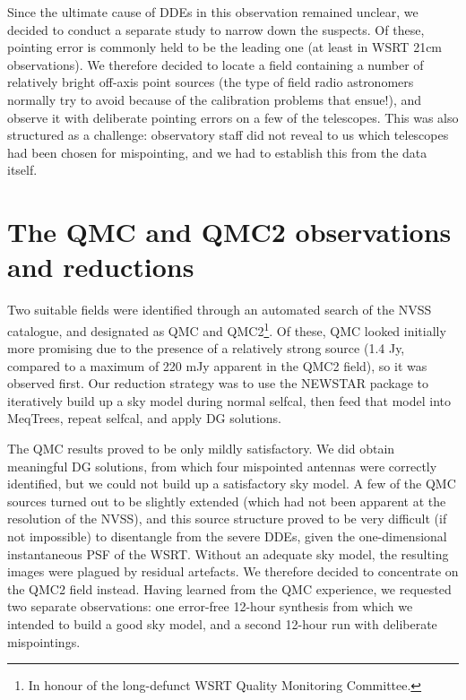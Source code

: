 \documentclass{aps2010} \special{papersize=8.5in,11in}
\begin{document}
Since the ultimate cause of DDEs in this observation remained unclear, we decided to conduct a separate study to narrow down the suspects. Of these, pointing error is commonly held to be the leading one (at least in WSRT 21cm observations). We therefore decided to locate a field containing a number of relatively bright off-axis point sources (the type of field radio astronomers normally try to avoid because of the calibration problems that ensue!), and observe it with deliberate pointing errors on a few of the telescopes. This was also structured as a challenge: observatory staff did not reveal to us which telescopes had been chosen for mispointing, and we had to establish this from the data itself.

\section{The QMC and QMC2 observations and reductions}

\noindent Two suitable fields were identified through an automated search of the NVSS catalogue, and designated as QMC and QMC2\footnote{In honour of the long-defunct WSRT Quality Monitoring Committee.}. Of these, QMC looked initially more promising due to the presence of a relatively strong source (1.4 Jy, compared to a maximum of 220 mJy apparent in the QMC2 field), so it was observed first. Our reduction strategy was to use the NEWSTAR package to iteratively build up a sky model during normal selfcal, then feed that model into MeqTrees, repeat selfcal, and apply DG solutions.

The QMC results proved to be only mildly satisfactory. We did obtain meaningful DG solutions, from which four mispointed antennas were correctly identified, but we could not build up a satisfactory sky model. A few of the QMC sources turned out to be slightly extended (which had not been apparent at the resolution of the NVSS), and this source structure proved to be very difficult (if not impossible) to disentangle from the severe DDEs, given the one-dimensional instantaneous PSF of the WSRT. Without an adequate sky model, the resulting images were plagued by residual artefacts. We therefore decided to concentrate on the QMC2 field instead. Having learned from the QMC experience, we requested two separate observations: one error-free 12-hour synthesis from which we intended to build a good sky model, and a second 12-hour run with deliberate mispointings.
\end{document}
